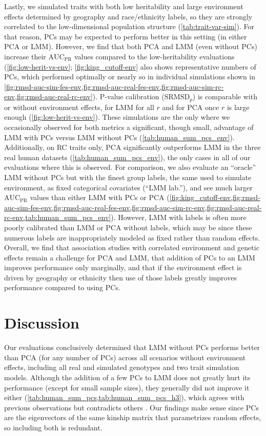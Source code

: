 \documentclass[11pt]{article}
\newcommand{\rmsd}{\text{SRMSD}_p}
\newcommand{\auc}{\text{AUC}_\text{PR}}
\begin{document}
\begin{linenumbers}
Lastly, we simulated traits with both low heritability and large environment effects determined by geography and race/ethnicity labels, so they are strongly correlated to the low-dimensional population structure (\cref{tab:trait-var-sim}).
For that reason, PCs may be expected to perform better in this setting (in either PCA or LMM).
However, we find that both PCA and LMM (even without PCs) increase their $\auc$ values compared to the low-heritability evaluations (\cref{fig:low-herit-vs-env}; \cref{fig:king_cutoff-env} also shows representative numbers of PCs, which performed optimally or nearly so in individual simulations shown in \cref{fig:rmsd-auc-sim-fes-env,fig:rmsd-auc-real-fes-env,fig:rmsd-auc-sim-rc-env,fig:rmsd-auc-real-rc-env}).
P-value calibration ($\rmsd$) is comparable with or without environment effects, for LMM for all $r$ and for PCA once $r$ is large enough (\cref{fig:low-herit-vs-env}).
These simulations are the only where we occasionally observed for both metrics a significant, though small, advantage of LMM with PCs versus LMM without PCs (\cref{tab:human_sum_pcs_env}).
Additionally, on RC traits only, PCA significantly outperforms LMM in the three real human datasets (\cref{tab:human_sum_pcs_env}), the only cases in all of our evaluations where this is observed.
For comparison, we also evaluate an ``oracle'' LMM without PCs but with the finest group labels, the same used to simulate environment, as fixed categorical covariates (``LMM lab.''), and see much larger $\auc$ values than either LMM with PCs or PCA (\cref{fig:king_cutoff-env,fig:rmsd-auc-sim-fes-env,fig:rmsd-auc-real-fes-env,fig:rmsd-auc-sim-rc-env,fig:rmsd-auc-real-rc-env,tab:human_sum_pcs_env}).
However, LMM with labels is often more poorly calibrated than LMM or PCA without labels, which may be since these numerous labels are inappropriately modeled as fixed rather than random effects.
Overall, we find that association studies with correlated environment and genetic effects remain a challenge for PCA and LMM, that addition of PCs to an LMM improves performance only marginally, and that if the environment effect is driven by geography or ethnicity then use of those labels greatly improves performance compared to using PCs.

\section{Discussion}

Our evaluations conclusively determined that LMM without PCs performs better than PCA (for any number of PCs) across all scenarios without environment effects, including all real and simulated genotypes and two trait simulation models.
Although the addition of a few PCs to LMM does not greatly hurt its performance (except for small sample sizes), they generally did not improve it either (\cref{tab:human_sum_pcs,tab:human_sum_pcs_h3}), which agrees with previous observations \citep{liu_controlling_2011} but contradicts others \citep{zhao_arabidopsis_2007, price_new_2010}.
Our findings make sense since PCs are the eigenvectors of the same kinship matrix that parametrizes random effects, so including both is redundant.


\end{linenumbers}
\end{document}

